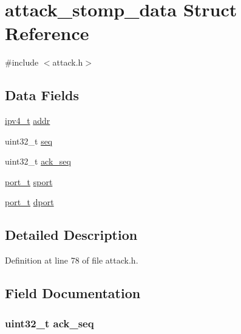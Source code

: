 \hypertarget{structattack__stomp__data}{}\section{attack\+\_\+stomp\+\_\+data Struct Reference}
\label{structattack__stomp__data}


{\ttfamily \#include $<$attack.\+h$>$}

\subsection*{Data Fields}
\begin{DoxyCompactItemize}
\item 
\hyperlink{loader_2src_2headers_2includes_8h_aaadf2e480fd246ff9e932039b223baed}{ipv4\+\_\+t} \hyperlink{structattack__stomp__data_a587426ea8fb6d0cbb271fa3abee2219c}{addr}
\item 
uint32\+\_\+t \hyperlink{structattack__stomp__data_aaf1b939170b82732448a965a5b33ad4e}{seq}
\item 
uint32\+\_\+t \hyperlink{structattack__stomp__data_ad2dc0a9dd826827f0d516a3f4ad8a047}{ack\+\_\+seq}
\item 
\hyperlink{loader_2src_2headers_2includes_8h_adccb5337cf206fe3eca7c4732f634bb9}{port\+\_\+t} \hyperlink{structattack__stomp__data_ace4d92a66754ba880f72f0d54f5c4f7d}{sport}
\item 
\hyperlink{loader_2src_2headers_2includes_8h_adccb5337cf206fe3eca7c4732f634bb9}{port\+\_\+t} \hyperlink{structattack__stomp__data_ae1d2e53d4da413ae3925b7c40c0f3133}{dport}
\end{DoxyCompactItemize}


\subsection{Detailed Description}


Definition at line 78 of file attack.\+h.



\subsection{Field Documentation}
\subsubsection[{\texorpdfstring{ack\+\_\+seq}{ack_seq}}]{\setlength{\rightskip}{0pt plus 5cm}uint32\+\_\+t ack\+\_\+seq}\hypertarget{structattack__stomp__data_ad2dc0a9dd826827f0d516a3f4ad8a047}{}\label{structattack__stomp__data_ad2dc0a9dd826827f0d516a3f4ad8a047}


